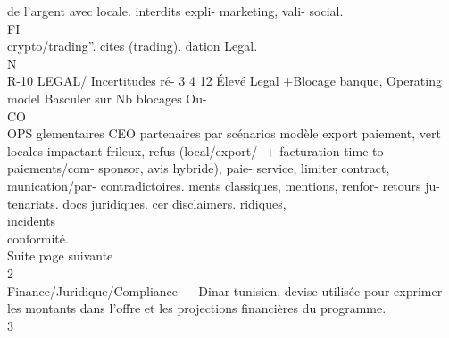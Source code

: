 de l’argent avec                       locale.           interdits expli- marketing, vali- social.\\
\vspace{0.5em}
\vspace{0.5em}
\vspace{0.5em}
\vspace{0.5em}
FI\\
crypto/trading”.                                         cites (trading). dation Legal.\\
\vspace{0.5em}
\vspace{0.5em}
\vspace{0.5em}
\vspace{0.5em}
N\\
R-10       LEGAL/   Incertitudes ré- 3 4 12 Élevé Legal +Blocage banque, Operating model Basculer         sur Nb blocages Ou-\\
\vspace{0.5em}
\vspace{0.5em}
\vspace{0.5em}
\vspace{0.5em}
CO\\
OPS      glementaires                  CEO    partenaires       par     scénarios modèle export paiement,          vert\\
locales impactant                    frileux,    refus (local/export/- +      facturation time-to-\\
paiements/com-                       sponsor,     avis hybride), paie- service, limiter contract,\\
munication/par-                      contradictoires. ments classiques, mentions, renfor- retours     ju-\\
tenariats.                                             docs juridiques. cer disclaimers. ridiques,\\
incidents\\
conformité.\\
Suite page suivante\\
\vspace{0.5em}
\vspace{0.5em}
\vspace{0.5em}
\vspace{0.5em}
2\\
Finance/Juridique/Compliance — Dinar tunisien, devise utilisée pour exprimer les montants dans l’offre et les projections financières du programme.\\
3\\
